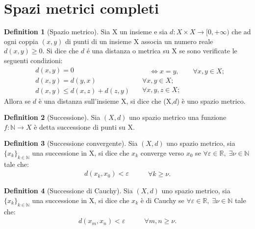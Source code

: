 \documentclass[leqno]{article}
\theoremstyle{definition}
\newtheorem{definition}{Definition}[section]
\numberwithin{equation}{section}
\theoremstyle{remark}
\begin{document}
	\section{Spazi metrici completi}
	\begin{definition}[Spazio metrico]
		Sia X un insieme e sia $d:X\times X \rightarrow [0,+ \infty)$ che ad ogni coppia $(x,y)$ di punti di un insieme X associa un numero reale $d(x,y)\ge 0$. Si dice che $d$ é una distanza o metrica su X se sono verificate le seguenti condizioni: 
		\begin{equation} 
			\begin{split}
				&d(x,y) = 0 \\
				&d(x,y)=d(y,x)\\
				&d(x,y)\le d(x,z) + d(z,y)
			\end{split}
			\quad
			\begin{split}
				\quad \Leftrightarrow x = y, \quad \quad \forall x,y \in X; \\
				\forall x,y \in X;\\
				\forall x,y,z \in X;
			\end{split}
		\end{equation}
		Allora se $d$ è una distanza sull'insieme X, si dice che (X,$d$) è uno spazio metrico.
	\end{definition}
	\begin{definition}[Successione]
		Sia $(X,d)$ uno spazio metrico una funzione $f:\mathbb{N} \rightarrow X$ è detta successione di punti su X.
	\end{definition}
	\begin{definition}[Successione convergente]
		Sia $(X,d)$ uno spazio metrico, sia $\{ x_k \} _{k \in \mathbb{N}}$ una successione in X, si dice che $x_k$ converge verso $x_0$ se $\forall \varepsilon \in \mathbb{R}, \; \exists  \nu \in \mathbb{N}$ tale che:
		\begin{equation}
			\begin{split}
				d(x_k,x_0)<\varepsilon
			\end{split}
			\quad  \quad 
			\begin{split}
				\forall k \ge \nu.
			\end{split}
		\end{equation}
	\end{definition}
	\begin{definition}[Successione di Cauchy]
		Sia $(X,d)$ uno spazio metrico, sia $\{x_k\}_{k\in\mathbb{N}}$ una successione in X, si dice che $x_k$ è di Cauchy se $\forall \varepsilon \in \mathbb{R}, \; \exists  \nu \in \mathbb{N}$ tale che:
		\begin{equation}
			\begin{split}
				d(x_m,x_n)<\varepsilon
			\end{split}
			\quad  \quad 
			\begin{split}
				\forall m,n \ge \nu.
			\end{split}
		\end{equation}
	\end{definition}
\end{document}
